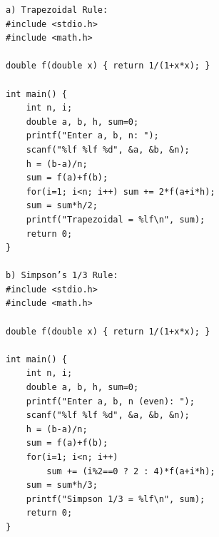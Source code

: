 \begin{verbatim}
a) Trapezoidal Rule:
#include <stdio.h>
#include <math.h>

double f(double x) { return 1/(1+x*x); }

int main() {
    int n, i;
    double a, b, h, sum=0;
    printf("Enter a, b, n: ");
    scanf("%lf %lf %d", &a, &b, &n);
    h = (b-a)/n;
    sum = f(a)+f(b);
    for(i=1; i<n; i++) sum += 2*f(a+i*h);
    sum = sum*h/2;
    printf("Trapezoidal = %lf\n", sum);
    return 0;
}

b) Simpson’s 1/3 Rule:
#include <stdio.h>
#include <math.h>

double f(double x) { return 1/(1+x*x); }

int main() {
    int n, i;
    double a, b, h, sum=0;
    printf("Enter a, b, n (even): ");
    scanf("%lf %lf %d", &a, &b, &n);
    h = (b-a)/n;
    sum = f(a)+f(b);
    for(i=1; i<n; i++)
        sum += (i%2==0 ? 2 : 4)*f(a+i*h);
    sum = sum*h/3;
    printf("Simpson 1/3 = %lf\n", sum);
    return 0;
}
\end{verbatim}